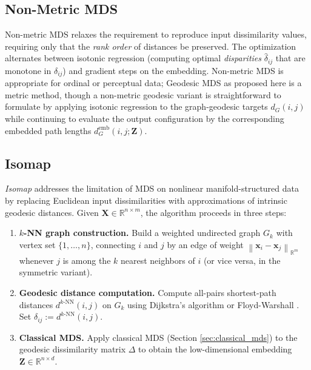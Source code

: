 \documentclass[twoside,11pt]{article}
\newcommand{\R}{\mathbb{R}}
\newcommand{\bx}{\mathbf{x}}
\newcommand{\bX}{\mathbf{X}}
\newcommand{\bZ}{\mathbf{Z}}
\newcommand{\norm}[1]{\left\|#1\right\|}
\newcommand{\demb}{d^{\mathrm{emb}}}
\newcommand{\dknn}{d^{k\text{-NN}}}
\newcommand{\Gk}{G_k}
\begin{document}
\subsection{Non-Metric MDS}
\label{sec:nonmetric_mds}

Non-metric MDS \citep{kruskal1964nonmetric, shepard1962analysis} relaxes
the requirement to reproduce input dissimilarity values, requiring only
that the \emph{rank order} of distances be preserved.  The optimization
alternates between isotonic regression (computing optimal
\emph{disparities} $\hat\delta_{ij}$ that are monotone in $\delta_{ij}$)
and gradient steps on the embedding.  Non-metric MDS is appropriate for
ordinal or perceptual data; Geodesic MDS as proposed here is a metric
method, though a non-metric geodesic variant is straightforward to
formulate by applying isotonic regression to the graph-geodesic targets
$d_G(i,j)$ while continuing to evaluate the output configuration by the
corresponding embedded path lengths $\demb_G(i,j;\bZ)$.

\subsection{Isomap}
\label{sec:isomap}

\emph{Isomap} \citep{tenenbaum2000global} addresses the limitation of MDS
on nonlinear manifold-structured data by replacing Euclidean input
dissimilarities with approximations of intrinsic geodesic distances.
Given $\bX \in \R^{n \times m}$, the algorithm proceeds in three steps:

\begin{enumerate}
  \item \textbf{$k$-NN graph construction.}  Build a weighted undirected
  graph $\Gk$ with vertex set $\{1, \ldots, n\}$, connecting $i$ and $j$
  by an edge of weight $\norm{\bx_i - \bx_j}_{\R^m}$ whenever $j$ is
  among the $k$ nearest neighbors of $i$ (or vice versa, in the symmetric
  variant).

  \item \textbf{Geodesic distance computation.}  Compute all-pairs
  shortest-path distances $\dknn(i,j)$ on $\Gk$ using Dijkstra's
  algorithm \citep{dijkstra1959note} or Floyd-Warshall
  \citep{floyd1962algorithm}.  Set $\delta_{ij} := \dknn(i,j)$.

  \item \textbf{Classical MDS.}  Apply classical MDS (Section
  \ref{sec:classical_mds}) to the geodesic dissimilarity matrix $\Delta$
  to obtain the low-dimensional embedding $\bZ \in \R^{n \times d}$.
\end{enumerate}
\end{document}
